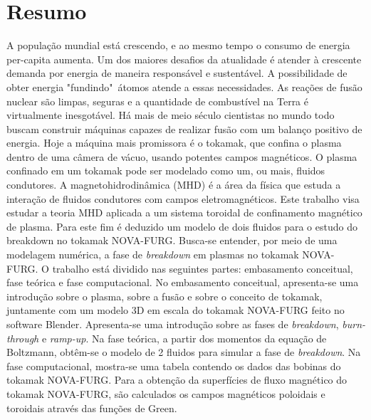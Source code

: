 \documentclass[12pt,oneside,a4paper]{abntex2}
\begin{document}
\chapter*{Resumo}
\noindent A população mundial está crescendo, e ao mesmo tempo o consumo de energia per-capita aumenta.
Um dos maiores desafios da atualidade é atender à crescente demanda por energia de maneira responsável e sustentável. 
A possibilidade de obter energia "fundindo"\ átomos atende a essas necessidades. 
As reações de fusão nuclear são limpas, seguras e a quantidade de combustível na Terra é virtualmente inesgotável. 
Há mais de meio século cientistas no mundo todo buscam construir máquinas capazes de realizar fusão com um balanço positivo de energia. 
Hoje a máquina mais promissora é o tokamak, que confina o plasma dentro de uma câmera de vácuo, usando potentes campos magnéticos. 
O plasma confinado em um tokamak pode ser modelado como um, ou mais, fluidos condutores. 
A magnetohidrodinâmica (MHD) é a área da física que estuda a interação de fluidos condutores com campos eletromagnéticos.   
Este trabalho visa estudar a teoria MHD aplicada a um sistema toroidal de confinamento magnético de plasma. 
Para este fim é deduzido um modelo de dois fluidos para o estudo do breakdown no tokamak NOVA-FURG. 
Busca-se entender, por meio de uma modelagem numérica, a fase de \textit{breakdown} em plasmas no tokamak NOVA-FURG. 
O trabalho está dividido nas seguintes partes: embasamento conceitual, fase teórica e fase computacional. No embasamento conceitual, apresenta-se uma introdução sobre o plasma, sobre a fusão e sobre o conceito de tokamak, juntamente com um modelo 3D em escala do tokamak NOVA-FURG feito no software Blender. Apresenta-se uma introdução sobre as fases de \textit{breakdown}, \textit{burn-through} e \textit{ramp-up}. 
Na fase teórica, a partir dos momentos da equação de Boltzmann, obtêm-se o modelo de 2 fluidos para simular a fase de \textit{breakdown}. Na fase computacional, mostra-se uma tabela contendo os dados das bobinas do tokamak NOVA-FURG. 
Para a obtenção da superfícies de fluxo magnético do tokamak NOVA-FURG, são calculados os campos magnéticos poloidais e toroidais através das funções de Green. 
\end{document}
